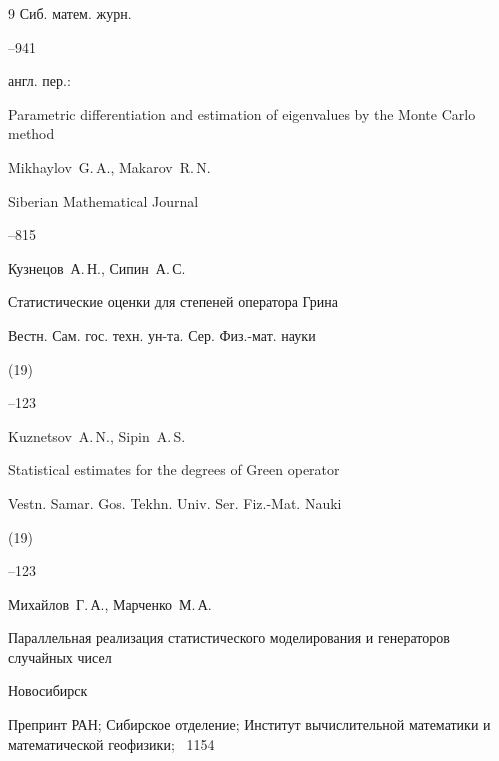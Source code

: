 \begin{thebibliography}{9}
        \jour Сиб. матем. журн.




        --941

\transl англ. пер.:

\paper Parametric differentiation and estimation of eigenvalues by the Monte Carlo method

\by Mikhaylov~G.\,A., Makarov~R.\,N. 

\jour Siberian Mathematical Journal




–815 




        \by Кузнецов~А.\,Н., Сипин~А.\,С.

        \paper Статистические оценки для степеней оператора Грина

        \jour Вестн. Сам. гос. техн. ун-та. Сер. Физ.-мат. науки


        (19)

        --123

\misctransl

\by Kuznetsov~A.\,N., Sipin~A.\,S.

\paper Statistical estimates for the degrees of Green operator

\jour Vestn. Samar. Gos. Tekhn. Univ. Ser. Fiz.-Mat. Nauki


(19)

--123






        \by Михайлов~Г.\,А., Марченко~М.\,А.

        \preprint Параллельная реализация статистического моделирования и генераторов случайных чисел

        \publaddr Новосибирск

        \preprintinfo Препринт РАН; Сибирское отделение; Институт вычислительной математики и математической геофизики; \No~1154



\end{thebibliography}
